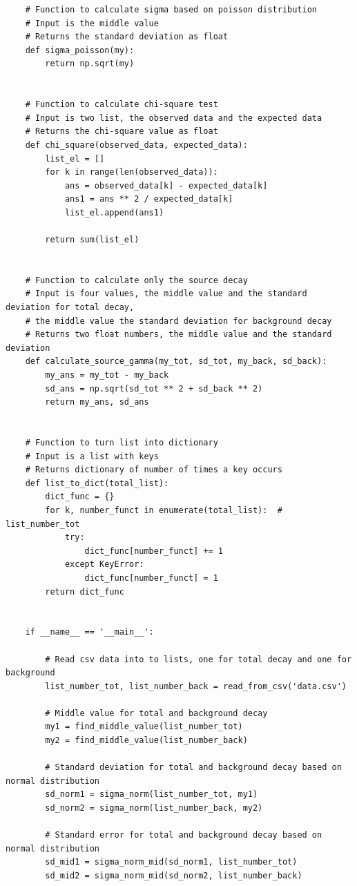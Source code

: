 \documentclass[twocolumn, 11pt]{article} %
\begin{document}
\begin{lstlisting}
    # Function to calculate sigma based on poisson distribution
    # Input is the middle value
    # Returns the standard deviation as float
    def sigma_poisson(my):
        return np.sqrt(my)


    # Function to calculate chi-square test
    # Input is two list, the observed data and the expected data
    # Returns the chi-square value as float
    def chi_square(observed_data, expected_data):
        list_el = []
        for k in range(len(observed_data)):
            ans = observed_data[k] - expected_data[k]
            ans1 = ans ** 2 / expected_data[k]
            list_el.append(ans1)

        return sum(list_el)


    # Function to calculate only the source decay
    # Input is four values, the middle value and the standard deviation for total decay,
    # the middle value the standard deviation for background decay
    # Returns two float numbers, the middle value and the standard deviation
    def calculate_source_gamma(my_tot, sd_tot, my_back, sd_back):
        my_ans = my_tot - my_back
        sd_ans = np.sqrt(sd_tot ** 2 + sd_back ** 2)
        return my_ans, sd_ans


    # Function to turn list into dictionary
    # Input is a list with keys
    # Returns dictionary of number of times a key occurs
    def list_to_dict(total_list):
        dict_func = {}
        for k, number_funct in enumerate(total_list):  # list_number_tot
            try:
                dict_func[number_funct] += 1
            except KeyError:
                dict_func[number_funct] = 1
        return dict_func


    if __name__ == '__main__':

        # Read csv data into to lists, one for total decay and one for background
        list_number_tot, list_number_back = read_from_csv('data.csv')

        # Middle value for total and background decay
        my1 = find_middle_value(list_number_tot)
        my2 = find_middle_value(list_number_back)

        # Standard deviation for total and background decay based on normal distribution
        sd_norm1 = sigma_norm(list_number_tot, my1)
        sd_norm2 = sigma_norm(list_number_back, my2)

        # Standard error for total and background decay based on normal distribution
        sd_mid1 = sigma_norm_mid(sd_norm1, list_number_tot)
        sd_mid2 = sigma_norm_mid(sd_norm2, list_number_back)


\end{lstlisting}
\end{document}
